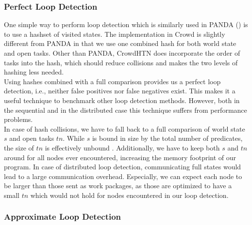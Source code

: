 \subsubsection{Perfect Loop Detection}
One simple way to perform loop detection which is similarly used in PANDA (\cite{holler2021loop}) is to use a hashset of visited states. The implementation in Crowd is slightly different from PANDA in that we use one combined hash for both world state and open tasks. Other than PANDA, CrowdHTN does incorporate the order of tasks into the hash, which should reduce collisions and makes the two levels of hashing less needed. \\
Using hashes combined with a full comparison provides us a perfect loop detection, i.e., neither false positives nor false negatives exist. This makes it a useful technique to benchmark other loop detection methods. However, both in the sequential and in the distributed case this technique suffers from performance problems. \\
In case of hash collisions, we have to fall back to a full comparison of world state $s$ and open tasks $tn$. While $s$ is bound in size by the total number of predicates, the size of $tn$ is effectively unbound . Additionally, we have to keep both $s$ and $tn$ around for all nodes ever encountered, increasing the memory footprint of our program.
In case of distributed loop detection, communicating full states would lead to a large communication overhead. Especially, we can expect each node to be larger than those sent as work packages, as those are optimized to have a small $tn$ which would not hold for nodes encountered in our loop detection.
\begin{comment}
	- Additionally, there is the full comparison for the world state
	- in practise this can be a problem, at the same time asymptotically it should not matter as it will be dwarfed by the 
	\todo{get some data on how many nodes share a world state on average as well as sizes of world states -> number of hash operations per world state!}
	- and the full comparison of open tasks
	- we cannot just free the open tasks and world state that are no longer needed! Both time and memory footprint are worse
	- worse memory and time complexity
	- however, it is a useful benchmark as to how many loops we *should* expect
\end{comment}

\subsubsection{Approximate Loop Detection}

